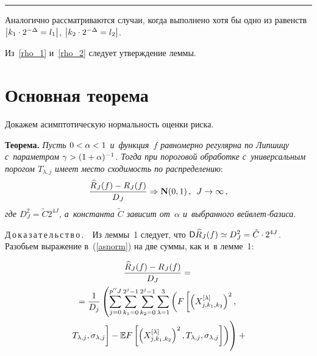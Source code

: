 \hrule

\vspace*{2pt}

\begin{multicols}{2}

\noindent
Аналогично рассматриваются случаи, когда выполнено хотя бы одно из равенств
 $\left\vert k_{1}\cdot2^{-\Delta} \hm= l_{1}\right\vert$,
 $\left\vert k_{2}\cdot 2^{-\Delta} \hm= l_{2}\right\vert$.

Из~\eqref{rho_1} и~\eqref{rho_2} следует утверждение леммы.

\vspace*{-6pt}


\section{Основная теорема}

Докажем асимптотическую нормальность оценки риска.

\smallskip

\noindent
\textbf{Теорема.}
\textit{Пусть $0\hm<\alpha<1$ и~функция~$f$ равномерно регулярна по Липшицу
с~параметром $\gamma\hm>(1\hm+\alpha)^{-1}$. Тогда при пороговой обработке
с~универсальным порогом $T_{\lambda,j}$ имеет место сходимость по распределению}:
\begin{equation}
\label{asnorm}
\displaystyle\frac{\displaystyle \widehat{R}_J(f) - R_J(f)\mathstrut}{\displaystyle  D_J \mathstrut} \Rightarrow \textbf{N}(0,1)\,, \enskip
J \rightarrow \infty\,,
\end{equation}
\textit{где $D_J^2 = \tilde{C} 2^{4J}$, а~константа $\tilde{C}$
зависит от~$\alpha$ и~выбранного вейв\-лет-ба\-зиса}.

\smallskip

\noindent
Д\,о\,к\,а\,з\,а\,т\,е\,л\,ь\,с\,т\,в\,о\,.\ \
Из леммы~1 следует, что $\Variance \widehat{R}_J(f)\hm\simeq D_J^2
\hm = \tilde{C}\cdot 2^{4J}$.
Разобьем выражение в~(\ref{asnorm}) на две суммы, как и~в лемме~1:


\noindent
\begin{multline*}
\fr{\widehat{R}_J(f) - R_J(f)}{ D_J } ={}\\
{}=\fr{1}{D_j}\left(
\sum\limits_{j = 0}^{p''J}\sum\limits_{k_1 = 0}^{2^j - 1}
\sum\limits_{k_2 = 0}^{2^j - 1}\sum\limits_{\lambda = 1}^{3}
\left(F\left[\left(X_{j,k_1,k_2}^{[\lambda]}\right)^2,\right.\right.\right.
\\
\left.\left.\left.T_{\lambda,j},
\sigma_{\lambda,j}
\vphantom{\left(X_{j,k_1,k_2}^{[\lambda]}\right)^2}
\right] -
\Expect F\left[\left(X_{j,k_1,k_2}^{[\lambda]}\right)^2,T_{\lambda,j},\sigma_{\lambda,j}
\right]
\right)\!
\vphantom{\sum\limits_{j = 0}^{p''J}\sum\limits_{k_1 = 0}^{2^j - 1}}
\right) +{}
\end{multline*}


\end{multicols}
